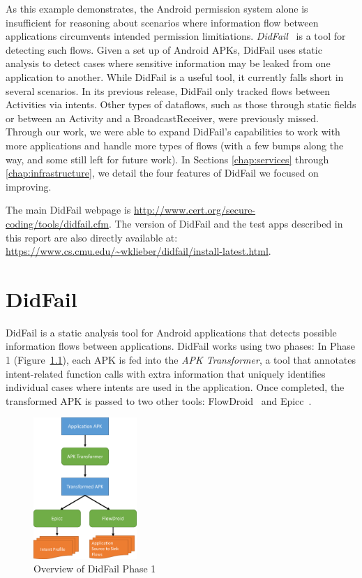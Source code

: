 As this example demonstrates, the Android permission system alone is insufficient for reasoning about scenarios where information flow between applications circumvents intended permission limitiations. \emph{DidFail}~\cite{didfail} is a tool for detecting such flows. Given a set up of Android APKs, DidFail uses static analysis to detect cases where sensitive information may be leaked from one application to another. While DidFail is a useful tool, it currently falls short in several scenarios. In its previous release, DidFail only tracked flows between Activities via intents. Other types of dataflows, such as those through static fields or between an Activity and a BroadcastReceiver, were previously missed. Through our work, we were able to expand DidFail's capabilities to work with more applications and handle more types of flows (with a few bumps along the way, and some still left for future work). In Sections \ref{chap:services} through \ref{chap:infrastructure}, we detail the four features of DidFail we focused on improving.

The main DidFail webpage is \url{http://www.cert.org/secure-coding/tools/didfail.cfm}.  The version of DidFail and the test apps described in this report are also directly available at: 
\\ \url{https://www.cs.cmu.edu/~wklieber/didfail/install-latest.html}.

\chapter{DidFail}

DidFail is a static analysis tool for Android applications that detects possible information flows between applications. DidFail works using two phases: In Phase 1 (Figure~\ref{fig:overview_phase1}), each APK is fed into the \emph{APK Transformer}, a tool that annotates intent-related function calls with extra information that uniquely identifies individual cases where intents are used in the application. Once completed, the transformed APK is passed to two other tools: FlowDroid~\cite{flowdroid} and Epicc~\cite{epicc}.

\begin{figure}[h]
	\centering
	\includegraphics[width=0.35\textwidth]{didfail1.pdf}
	\caption{Overview of DidFail Phase 1}
	\label{fig:overview_phase1}
\end{figure}

